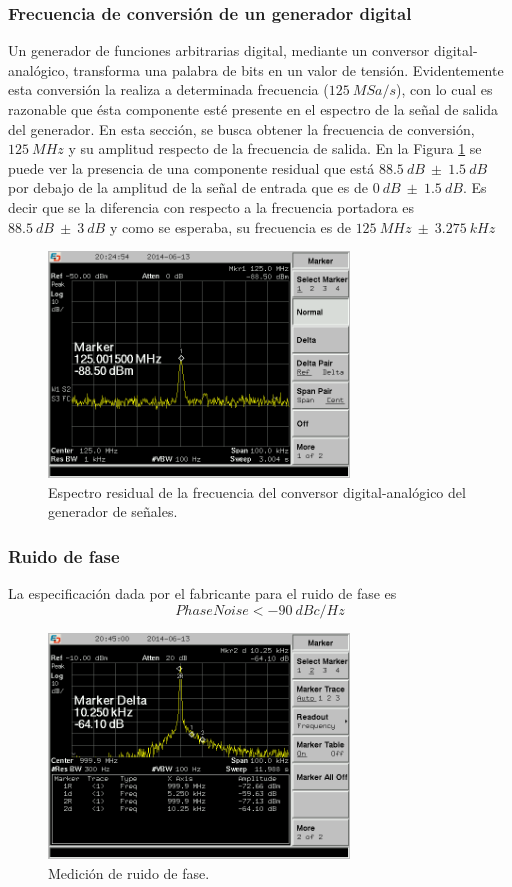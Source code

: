 \documentclass[a4paper,10pt]{article}
\begin{document}
		\subsubsection{Frecuencia de conversi\'on de un generador digital}
		\indent Un generador de funciones arbitrarias digital, mediante un 
		conversor digital-anal\'ogico, transforma una palabra de bits en un 
		valor de tensi\'on. Evidentemente esta conversi\'on la realiza a 
		determinada frecuencia ($125~MSa/s$), con lo cual es razonable que 
		\'esta componente est\'e presente en el espectro de la se\~nal de salida
		del generador. En esta secci\'on, se busca obtener la frecuencia de 
		conversi\'on, $125~MHz$ y su amplitud respecto de la frecuencia de 
		salida. En la Figura \ref{freqres} se puede ver la presencia de una 
		componente residual que est\'a $88.5~dB~\pm~1.5~dB$ por debajo de la 
		amplitud de la se\~nal de entrada que es de $0~dB~\pm~1.5~dB$. Es decir 
		que se la diferencia con respecto a la frecuencia portadora es 
		$88.5~dB~\pm~3~dB$ y como se esperaba, su frecuencia es de 
		$125~MHz~\pm~3.275~kHz$
		
		\begin{figure}[!htb]
				\centering
				\includegraphics[width=8cm]
				{Imagenes/SCREN448.png}
				\caption{Espectro residual de la frecuencia del conversor 
				digital-anal\'ogico del generador de se\~nales.}
				\label{freqres} 
		\end{figure}
		
		\subsubsection{Ruido de fase}
		\indent La especificaci\'on dada por el fabricante para el ruido de fase
		es 
		$$Phase Noise<-90~dBc/Hz$$
		
		\begin{figure}[!htb]
				\centering
				\includegraphics[width=8cm]
				{Imagenes/SCREN451.png}
				\caption{Medici\'on de ruido de fase.}
				\label{ruidofase} 
		\end{figure}
		
\end{document}
